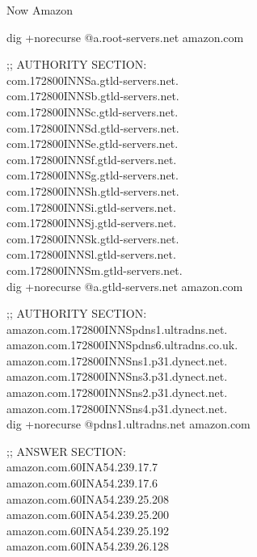 \documentclass[11pt]{article}
\begin{document}
\begin{enumerate}[label=(\alph*)]
Now Amazon

dig +norecurse @a.root-servers.net amazon.com

;; AUTHORITY SECTION:\\
com.172800INNSa.gtld-servers.net.\\
com.172800INNSb.gtld-servers.net.\\
com.172800INNSc.gtld-servers.net.\\
com.172800INNSd.gtld-servers.net.\\
com.172800INNSe.gtld-servers.net.\\
com.172800INNSf.gtld-servers.net.\\
com.172800INNSg.gtld-servers.net.\\
com.172800INNSh.gtld-servers.net.\\
com.172800INNSi.gtld-servers.net.\\
com.172800INNSj.gtld-servers.net.\\
com.172800INNSk.gtld-servers.net.\\
com.172800INNSl.gtld-servers.net.\\
com.172800INNSm.gtld-servers.net.\\


dig +norecurse @a.gtld-servers.net amazon.com

;; AUTHORITY SECTION:\\
amazon.com.172800INNSpdns1.ultradns.net.\\
amazon.com.172800INNSpdns6.ultradns.co.uk.\\
amazon.com.172800INNSns1.p31.dynect.net.\\
amazon.com.172800INNSns3.p31.dynect.net.\\
amazon.com.172800INNSns2.p31.dynect.net.\\
amazon.com.172800INNSns4.p31.dynect.net.\\


dig +norecurse @pdns1.ultradns.net amazon.com

;; ANSWER SECTION:\\
amazon.com.60INA54.239.17.7\\
amazon.com.60INA54.239.17.6\\
amazon.com.60INA54.239.25.208\\
amazon.com.60INA54.239.25.200\\
amazon.com.60INA54.239.25.192\\
amazon.com.60INA54.239.26.128\\


\end{enumerate}
\end{document}

